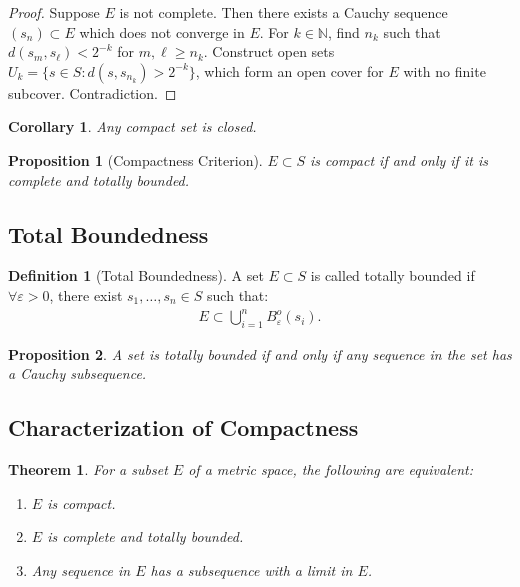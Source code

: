 \documentclass[9pt]{article}
\theoremstyle{definition}
\newtheorem{definition}{Definition}
\theoremstyle{plain}
\newtheorem{theorem}{Theorem}
\newtheorem{proposition}{Proposition}
\newtheorem{corollary}{Corollary}
\begin{document}
\begin{proof}
Suppose $ E $ is not complete. Then there exists a Cauchy sequence $ (s_n) \subset E $ which does not converge in $ E $. For $ k \in \mathbb{N} $, find $ n_k $ such that $ d(s_m, s_\ell) < 2^{-k} $ for $ m, \ell \geq n_k $. Construct open sets $ U_k = \{s \in S : d(s, s_{n_k}) > 2^{-k}\} $, which form an open cover for $ E $ with no finite subcover. Contradiction.
\end{proof}

\begin{corollary}
Any compact set is closed.
\end{corollary}

\begin{proposition}[Compactness Criterion]
$ E \subset S $ is compact if and only if it is complete and totally bounded.
\end{proposition}

\subsection*{Total Boundedness}
\begin{definition}[Total Boundedness]
A set $ E \subset S $ is called totally bounded if $ \forall \varepsilon > 0 $, there exist $ s_1, \ldots, s_n \in S $ such that:
\begin{align}
E \subset \bigcup_{i=1}^n B_\varepsilon^o(s_i).
\end{align}
\end{definition}

\begin{proposition}
A set is totally bounded if and only if any sequence in the set has a Cauchy subsequence.
\end{proposition}

\subsection*{Characterization of Compactness}
\begin{theorem}
For a subset $ E $ of a metric space, the following are equivalent:
\begin{enumerate}
    \item $ E $ is compact.
    \item $ E $ is complete and totally bounded.
    \item Any sequence in $ E $ has a subsequence with a limit in $ E $.
\end{enumerate}
\end{theorem}
\end{document}
